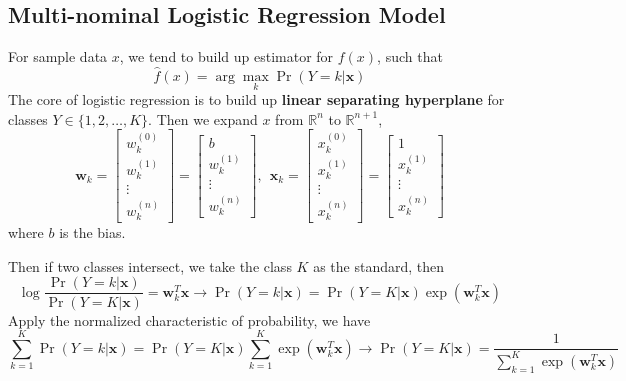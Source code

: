 \documentclass[12pt]{article}
\begin{document}
\subsection{Multi-nominal Logistic Regression Model}
For sample data $x$, we tend to build up estimator for $f(x)$, such that
\begin{equation}
    \hat f(x) = \arg \max_{k} \Pr \left( Y = k | \bm{x}\right)
\end{equation}
The core of logistic regression is to build up \textbf{linear separating hyperplane} for classes $Y \in \{1,2,\dots,K\}$. Then we expand $x$ from $\mathbb{R}^n$ to $\mathbb{R}^{n+1}$,
\begin{equation}
    \bm{w}_{k} = \begin{bmatrix}
        w_k^{(0)} \\ w_k^{(1)} \\ \vdots \\ w_k^{(n)}
    \end{bmatrix} = \begin{bmatrix}
        b \\ w_k^{(1)} \\ \vdots \\ w_k^{(n)}
    \end{bmatrix},~~\bm{x}_k = \begin{bmatrix} x_k^{(0)} \\ x_k^{(1)} \\ \vdots \\ x_k^{(n)}
    \end{bmatrix} = \begin{bmatrix} 1 \\ x_k^{(1)} \\ \vdots \\ x_k^{(n)}
    \end{bmatrix}
\end{equation}
where $b$ is the bias. \par
Then if two classes intersect, we take the class $K$ as the standard, then
\begin{equation}
    \log \frac{\Pr(Y = k|\bm{x})}{\Pr(Y=K|\bm{x})} = \bm{w}_k^T\bm{x} \rightarrow \Pr(Y = k|\bm{x}) = \Pr(Y=K|\bm{x}) \exp(\bm{w}_k^T\bm{x})
\end{equation}
Apply the normalized characteristic of probability, we have
\begin{equation}
    \sum_{k=1}^K \Pr(Y = k|\bm{x}) = \Pr(Y = K|\bm{x})\sum_{k=1}^K\exp(\bm{w}_k^T \bm{x}) \longrightarrow \Pr(Y = K|\bm{x}) = \frac{1}{\sum_{k=1}^K \exp(\bm{w}_k^T \bm{x})}
\end{equation}
\end{document}
